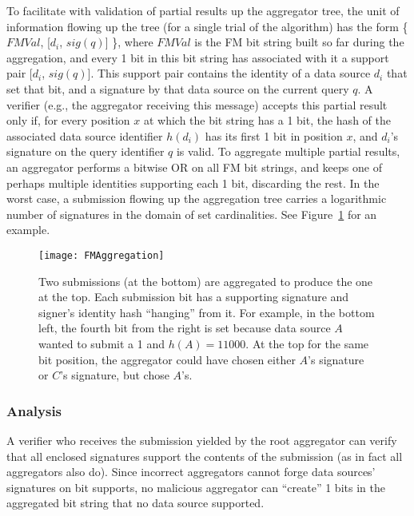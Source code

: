 \documentclass[11pt,twocolumn]{MyTightStyle}
\theoremstyle{plain}
\theoremstyle{definition}
\theoremstyle{remark}
\numberwithin{equation}{section}
\begin{document}
To facilitate with validation of partial results up the aggregator tree,
the unit of information flowing up the tree (for a single trial of the
algorithm) has the form \{$\mathit{FMVal}$, [$d_i$, $\mathit{sig}(q)$]
\}, where $\mathit{FMVal}$ is the FM bit string built so far during the
aggregation, and every 1 bit in this bit string has associated with it
a support pair [$d_i$, $\mathit{sig}(q)$].  This support pair contains
the identity of a data source $d_i$ that set that bit, and a signature
by that data source on the current query $q$.   
A verifier (e.g., the aggregator receiving this
message) accepts this partial result only if, for every position $x$ at
which the bit string has a 1 bit, the hash of the associated
data source identifier $h(d_i)$ has its first 1 bit in position $x$, and
$d_i$'s signature on the query identifier $q$ is valid.
To aggregate multiple partial results, an aggregator performs a bitwise
OR on all FM bit strings, and keeps one of perhaps multiple identities
supporting each 1 bit, discarding the rest.
In the worst case, a submission
flowing up the aggregation tree carries a logarithmic number of
signatures in the domain of set cardinalities.  See
Figure~\ref{fig:FMAggregation} for an example.

\begin{figure}
\begin{center}
\texttt{[image: FMAggregation]}
\caption{\label{fig:FMAggregation} Two submissions (at the bottom) are
  aggregated to produce the one at the top.  Each submission bit has a
  supporting signature and signer's identity hash ``hanging'' from it.
  For example, in the bottom left, the fourth bit from the right is set
  because data source $A$ wanted to submit a 1 and $h(A) = 11000$.  At
  the top for the same bit position, the aggregator could have chosen
  either $A$'s signature or $C$'s signature, but chose $A$'s.}
\end{center}
\end{figure}


\subsubsection{Analysis}
\label{sec:probabilisticCounting:analysis}

A verifier who receives the submission yielded by the root aggregator
can verify that all enclosed signatures support the contents of the
submission (as in fact all aggregators also do).  Since incorrect
aggregators cannot forge data sources' signatures on bit supports, no
malicious aggregator can ``create'' 1 bits in the aggregated bit string
that no data source supported.
\end{document}
